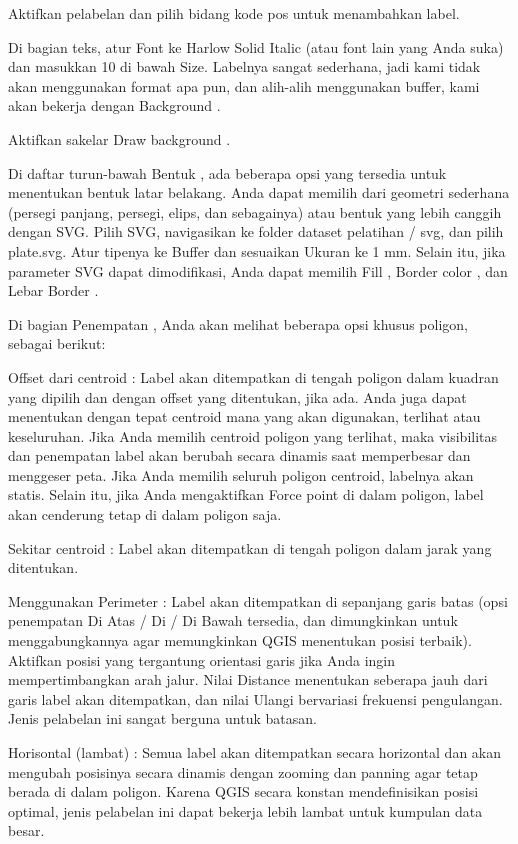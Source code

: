 \documentclass[]{book}
\begin{document}
Aktifkan pelabelan dan pilih bidang kode pos untuk menambahkan label.

Di bagian teks, atur Font ke Harlow Solid Italic (atau font lain yang Anda suka) dan masukkan 10 di bawah Size. Labelnya sangat sederhana, jadi kami tidak akan menggunakan format apa pun, dan alih-alih menggunakan buffer, kami akan bekerja dengan Background .

Aktifkan sakelar Draw background .

Di daftar turun-bawah Bentuk , ada beberapa opsi yang tersedia untuk menentukan bentuk latar belakang. Anda dapat memilih dari geometri sederhana (persegi panjang, persegi, elips, dan sebagainya) atau bentuk yang lebih canggih dengan SVG. Pilih SVG, navigasikan ke folder dataset pelatihan / svg, dan pilih plate.svg. Atur tipenya ke Buffer dan sesuaikan Ukuran ke 1 mm. Selain itu, jika parameter SVG dapat dimodifikasi, Anda dapat memilih Fill , Border color , dan Lebar Border .

Di bagian Penempatan , Anda akan melihat beberapa opsi khusus poligon, sebagai berikut:

Offset dari centroid :
Label akan ditempatkan di tengah poligon dalam kuadran yang dipilih dan dengan offset yang ditentukan, jika ada. Anda juga dapat menentukan dengan tepat centroid mana yang akan digunakan, terlihat atau keseluruhan. Jika Anda memilih centroid poligon yang terlihat, maka visibilitas dan penempatan label akan berubah secara dinamis saat memperbesar dan menggeser peta. Jika Anda memilih seluruh poligon centroid, labelnya akan statis. Selain itu, jika Anda mengaktifkan Force point di dalam poligon, label akan cenderung tetap di dalam poligon saja.

Sekitar centroid :
Label akan ditempatkan di tengah poligon dalam jarak yang ditentukan.

Menggunakan Perimeter :
Label akan ditempatkan di sepanjang garis batas (opsi penempatan Di Atas / Di / Di Bawah tersedia, dan dimungkinkan untuk menggabungkannya agar memungkinkan QGIS menentukan posisi terbaik). Aktifkan posisi yang tergantung orientasi garis jika Anda ingin mempertimbangkan arah jalur. Nilai Distance menentukan seberapa jauh dari garis label akan ditempatkan, dan nilai Ulangi bervariasi frekuensi pengulangan. Jenis pelabelan ini sangat berguna untuk batasan.

Horisontal (lambat) :
Semua label akan ditempatkan secara horizontal dan akan mengubah posisinya secara dinamis dengan zooming dan panning agar tetap berada di dalam poligon. Karena QGIS secara konstan mendefinisikan posisi optimal, jenis pelabelan ini dapat bekerja lebih lambat untuk kumpulan data besar.
\end{document}
